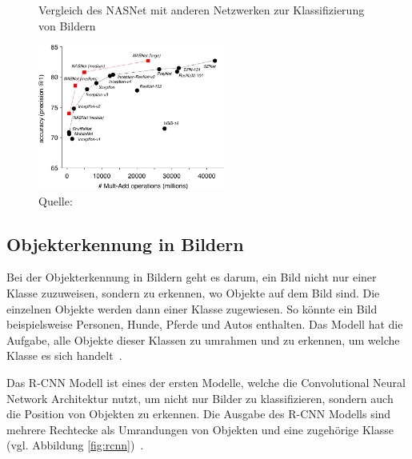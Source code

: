 \begin{figure}[h]
    \captionsetup{width=.9\linewidth}
    \caption{Vergleich des NASNet mit anderen Netzwerken zur Klassifizierung von Bildern}
    \label{nasnet-comparision}
    \centering
    \includegraphics[width=0.55\textwidth]{graphics/nasnet-comparision.jpg}
    \caption*{Quelle: \textcite{GoogleNasNet}}
\end{figure}

\subsection{Objekterkennung in Bildern}
\label{chap:object-detection}

Bei der Objekterkennung in Bildern geht es darum, ein Bild nicht nur einer Klasse zuzuweisen, sondern zu erkennen, wo Objekte auf dem Bild sind. Die einzelnen Objekte werden dann einer Klasse zugewiesen. So könnte ein Bild beispielsweise Personen, Hunde, Pferde und Autos enthalten. Das Modell hat die Aufgabe, alle Objekte dieser Klassen zu umrahmen und zu erkennen, um welche Klasse es sich handelt~\autocite{Goodfellow2016}.

Das R-CNN Modell ist eines der ersten Modelle, welche die Convolutional Neural Network Architektur nutzt, um nicht nur Bilder zu klassifizieren, sondern auch die Position von Objekten zu erkennen. Die Ausgabe des R-CNN Modells sind mehrere Rechtecke als Umrandungen von Objekten und eine zugehörige Klasse (vgl. Abbildung \ref{fig:rcnn})~\autocite{SSD}.

